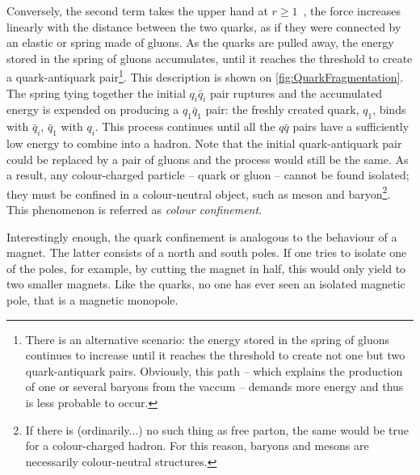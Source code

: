 Conversely, the second term takes the upper hand at $r \geq 1$~\fm, the force increases linearly with the distance between the two quarks, as if they were connected by an elastic or spring made of gluons. As the quarks are pulled away, the energy stored in the spring of gluons accumulates, until it reaches the threshold to create a quark-antiquark pair\footnote{There is an alternative scenario: the energy stored in the spring of gluons continues to increase until it reaches the threshold to create not one but two quark-antiquark pairs. Obviously, this path -- which explains the production of one or several baryons from the vaccum -- demands more energy and thus is less probable to occur.}. This description is shown on \fig\ref{fig:QuarkFragmentation}. The spring tying together the initial $q_{i}\bar{q}_{i}$ pair ruptures and the accumulated energy is expended on producing a $q_{1}\bar{q}_{1}$ pair: the freshly created quark, $q_{1}$, binds with $\bar{q}_{i}$,  $\bar{q}_{1}$ with $q_{i}$. This process continues until all the $q\bar{q}$ pairs have a sufficiently low energy to combine into a hadron. Note that the initial quark-antiquark pair could be replaced by a pair of gluons and the process would still be the same. As a result, any colour-charged particle -- quark or gluon -- cannot be found isolated; they must be confined in a colour-neutral object, such as meson and baryon\footnote{If there is (ordinarily...) no such thing as free parton, the same would be true for a colour-charged hadron. For this reason, baryons and mesons are necessarily colour-neutral structures.}. This phenomenon is referred as \textit{colour confinement}.


Interestingly enough, the quark confinement is analogous to the behaviour of a magnet. The latter consists of a north and south poles. If one tries to isolate one of the poles, for example, by cutting the magnet in half, this would only yield to two smaller magnets. Like the quarks, no one has ever seen an isolated magnetic pole, that is a magnetic monopole.

